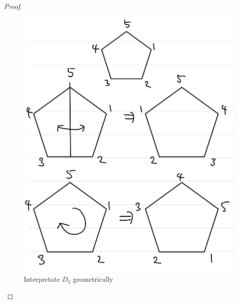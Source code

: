\documentclass[12pt, psamsfonts]{amsart}
\theoremstyle{definition}
\theoremstyle{remark}
\numberwithin{equation}{section}
\begin{document}
\begin{proof}
\begin{enumerate}
\begin{figure}
         \includegraphics[width=\linewidth]{pentagon.jpg}
           \caption{Interpretate $D_5$ geometrically}
         \label{fig:maps}
       \end{figure}
  \end{enumerate}
\end{proof}
\end{document}

